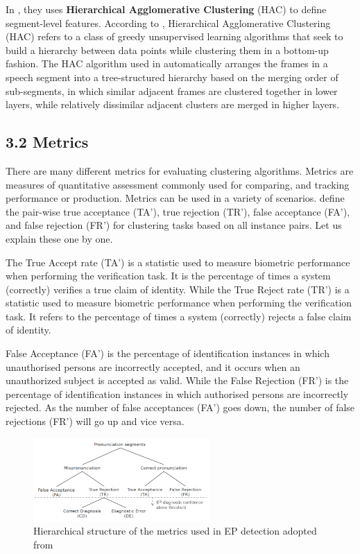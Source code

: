 \documentclass[nobib]{tufte-handout}
\begin{document}
In \cite{wang2015supervised}, they uses \textbf{Hierarchical Agglomerative Clustering} (HAC) to define segment-level features. According to \cite{chhabra2020fair}, Hierarchical Agglomerative Clustering (HAC) refers to a class of greedy unsupervised learning algorithms that seek to build a hierarchy between data points while clustering them in a bottom-up fashion. The HAC algorithm used in \cite{wang2015supervised} automatically arranges the frames in a speech segment into a tree-structured hierarchy based on the merging order of sub-segments, in which similar adjacent frames are clustered together in lower layers, while relatively dissimilar adjacent clusters are merged in higher layers. 


\subsection{\textbf{3.2 Metrics}}

There are many different metrics for evaluating clustering algorithms. 
Metrics are measures of quantitative assessment commonly used for comparing, and tracking performance or production. Metrics can be used in a variety of scenarios.  \cite{wang2015supervised}  define the pair-wise true acceptance (TA’), true rejection (TR’), false acceptance (FA’), and false rejection (FR’) for clustering tasks based on all instance pairs. Let us explain these one by one. 

The True Accept rate (TA’) is a statistic used to measure biometric performance when performing the verification task. It is the percentage of times a system (correctly) verifies a true claim of identity. While the True Reject rate (TR’) is a statistic used to measure biometric performance when performing the verification task. It refers to the percentage of times a system (correctly) rejects a false claim of identity.


False Acceptance (FA’) is the percentage of identification instances in which unauthorised persons are incorrectly accepted, and it occurs when an unauthorized subject is accepted as valid. While the False Rejection (FR') is the percentage of identification instances in which authorised persons are incorrectly rejected. As the number of false acceptances (FA') goes down, the number of false rejections (FR') will go up and vice versa.

\begin{figure}
 \includegraphics[width=0.6\textwidth]{metrics.png}
  \caption{Hierarchical structure of the metrics used in EP detection adopted from  \cite{wang2015supervised}}
\end{figure}
\end{document}

